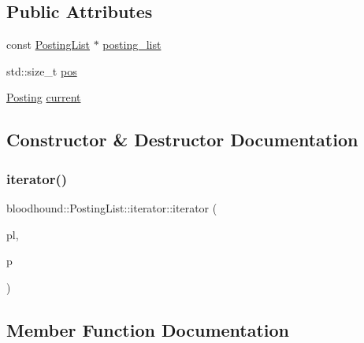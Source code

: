 \subsection*{Public Attributes}
\begin{DoxyCompactItemize}
\item 
const \hyperlink{classbloodhound_1_1PostingList}{Posting\+List} $\ast$ \hyperlink{structbloodhound_1_1PostingList_1_1iterator_a3a9afedb85f883831ee68fee0611ca92}{posting\+\_\+list}
\item 
std\+::size\+\_\+t \hyperlink{structbloodhound_1_1PostingList_1_1iterator_a544fdd6020d2ec35d883250dd79115e8}{pos}
\item 
\hyperlink{structbloodhound_1_1Posting}{Posting} \hyperlink{structbloodhound_1_1PostingList_1_1iterator_ae4e6a0f32f80ac9f64558843a0a0cf0e}{current}
\end{DoxyCompactItemize}


\subsection{Constructor \& Destructor Documentation}
\mbox{\label{structbloodhound_1_1PostingList_1_1iterator_af815248890d1f92dbd2cc3fa5813875a}} 
\subsubsection{\texorpdfstring{iterator()}{iterator()}}
{\footnotesize\ttfamily bloodhound\+::\+Posting\+List\+::iterator\+::iterator (\begin{DoxyParamCaption}\item[{const \hyperlink{classbloodhound_1_1PostingList}{Posting\+List} $\ast$}]{pl,  }\item[{std\+::size\+\_\+t}]{p }\end{DoxyParamCaption})\hspace{0.3cm}{\ttfamily [inline]}}



\subsection{Member Function Documentation}
\mbox{\label{structbloodhound_1_1PostingList_1_1iterator_a995d206215c6a01d7a183666502e2628}} 
